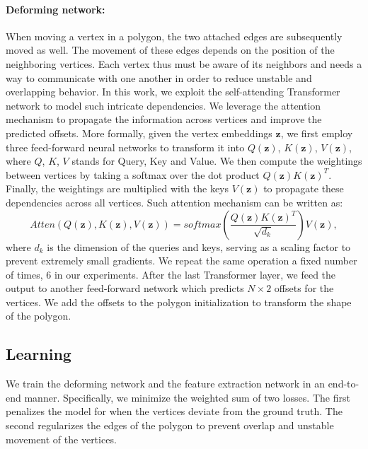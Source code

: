 \documentclass[10pt,twocolumn,letterpaper]{article}
\begin{document}
\paragraph{Deforming network:}
When moving a vertex in a polygon, the two attached edges are subsequently moved as well. The movement of these edges depends on the position of the neighboring vertices. Each vertex thus must be aware of its neighbors and needs a way to communicate with one another in order to reduce unstable and overlapping behavior. 
In this work, we exploit the self-attending Transformer network \cite{transformer} to model such intricate dependencies. We leverage the attention mechanism to propagate the information across vertices and improve the predicted offsets.
More formally, given the vertex embeddings $\pmb{z}$, we first employ three feed-forward neural networks to transform it into $Q(\pmb{z})$, $K(\pmb{z})$, $V(\pmb{z})$, where $Q$, $K$, $V$ stands for Query, Key and Value. We then compute the weightings between vertices by taking a softmax over the dot product $Q(\pmb{z})K(\pmb{z})^T$. Finally, the weightings are multiplied with the keys $V(\pmb{z})$ to propagate these dependencies across all vertices. Such attention mechanism can be written as:
\[
	 Atten(Q(\pmb{z}), K(\pmb{z}), V(\pmb{z}))=softmax(\frac{Q(\pmb{z})K(\pmb{z})^T}{\sqrt{d_k}})V(\pmb{z}), \label{eq:attn}
\]
where $d_k$ is the dimension of the queries and keys, serving as a scaling factor to prevent extremely small gradients. We repeat the same operation a fixed number of times, 6 in our experiments. After the last Transformer layer, we feed the output to another feed-forward network which predicts $N \times 2$ offsets for the vertices. We add the offsets to the polygon initialization to transform the shape of the polygon.


\subsection{Learning}
We train the deforming network and the feature extraction network in an end-to-end manner.
Specifically, we minimize the weighted sum of two losses. The first penalizes the model for when the vertices deviate from the ground truth. The second regularizes the edges of the polygon to prevent overlap and unstable movement of the vertices. 
\end{document}
